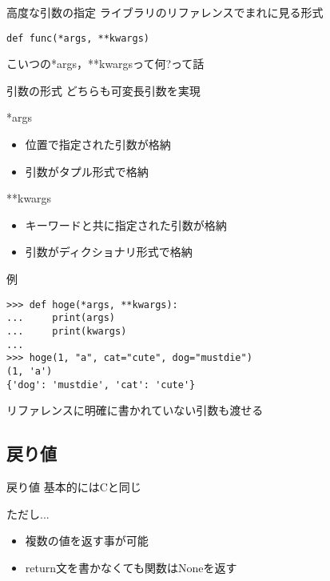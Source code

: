 \documentclass[12pt, xetex, xcolor=pdftex, dvipsnames]{beamer}
\begin{document}
\begin{frame}[fragile]{高度な引数の指定}
ライブラリのリファレンスでまれに見る形式

\begin{lstlisting}
def func(*args, **kwargs)
\end{lstlisting}

こいつの*args，**kwargsって何?って話
\end{frame}
\begin{frame}{引数の形式}
    どちらも\alert{可変長引数}を実現

    \begin{block}{*args}
        \begin{itemize}
            \item 位置で指定された引数が格納
            \item 引数がタプル形式で格納
        \end{itemize}
    \end{block}
    \begin{block}{**kwargs}
        \begin{itemize}
            \item キーワードと共に指定された引数が格納
            \item 引数がディクショナリ形式で格納
        \end{itemize}
    \end{block}
\end{frame}
\begin{frame}[fragile]{例}
\begin{lstlisting}
>>> def hoge(*args, **kwargs):
...     print(args)
...     print(kwargs)
...
>>> hoge(1, "a", cat="cute", dog="mustdie")
(1, 'a')
{'dog': 'mustdie', 'cat': 'cute'}
\end{lstlisting}
\pause

リファレンスに明確に書かれていない引数も渡せる
\end{frame}
\subsection{戻り値}
\begin{frame}{戻り値}
    基本的にはCと同じ

    ただし...
    \begin{itemize}
        \item 複数の値を返す事が可能
        \item return文を書かなくても関数はNoneを返す
    \end{itemize}
\end{frame}
\end{document}
